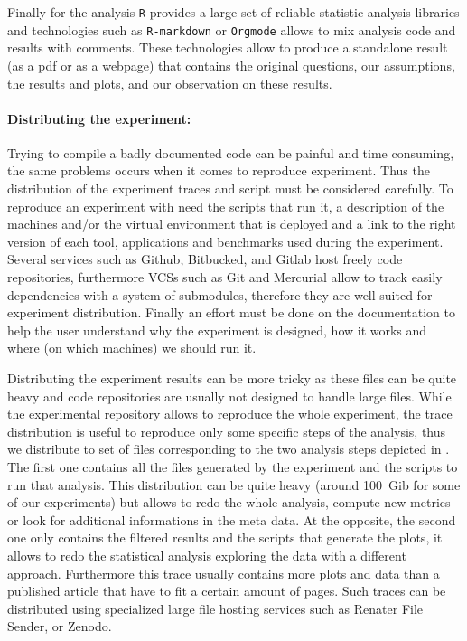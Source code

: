Finally for the analysis \texttt{R} provides a large set of reliable statistic
analysis libraries and technologies such as \texttt{R-markdown} or
\texttt{Orgmode} allows to mix analysis code and results with comments. These
technologies allow to produce a standalone result (as a pdf or as a webpage)
that contains the original questions, our assumptions, the results and plots,
and our observation on these results.

\paragraph{Distributing the experiment:}

Trying to compile a badly documented code can be painful and time consuming,
the same problems occurs when it comes to reproduce experiment. Thus the
distribution of the experiment traces and script must be considered carefully.
To reproduce an experiment with need the scripts that run it, a description of
the machines and/or the virtual environment that is deployed and a link to the
right version of each tool, applications and benchmarks used during the
experiment. Several services such as Github, Bitbucked, and Gitlab 
host freely code repositories, furthermore \glspl{VCS} such as Git and
Mercurial  allow to track easily dependencies with a system
of submodules, therefore they are well suited for experiment distribution.
Finally an effort must be done on the documentation to help the user
understand why the experiment is designed, how it works and where (on which
machines) we should run it.

Distributing the experiment results can be more tricky as these files can be
quite heavy and code repositories are usually not designed to handle large
files. While the experimental repository allows to reproduce the whole
experiment, the trace distribution is useful to reproduce only some specific
steps of the analysis, thus we distribute to set of files corresponding to the
two analysis steps depicted in . The first one contains all
the files generated by the experiment and the scripts to run that analysis.
This distribution can be quite heavy (around \SI{100}{Gib} for some of our
experiments) but allows to redo the whole analysis, compute new metrics or
look for additional informations in the meta data. At the opposite, the second
one only contains the filtered results and the scripts that generate the
plots, it allows to redo the statistical analysis exploring the data with a
different approach. Furthermore this trace usually contains more plots and
data than a published article that have to fit a certain amount of pages. Such
traces can be distributed using specialized large file hosting services such
as Renater File Sender, or Zenodo.


